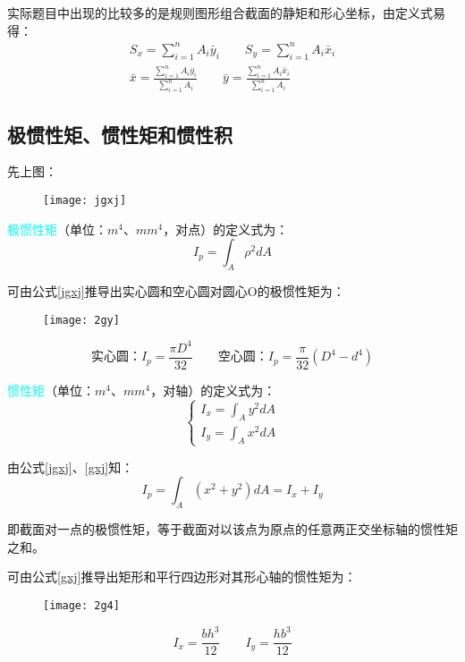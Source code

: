 \documentclass[10pt,a4paper]{ctexart}
\begin{document}
实际题目中出现的比较多的是规则图形组合截面的静矩和形心坐标，由定义式易得：
\begin{gather}
	S_x=\sum_{i=1}^n A_i\bar{y}_i \qquad S_y=\sum_{i=1}^n A_i\bar{x}_i\\
	\bar{x}=\frac{\sum\limits_{i=1}^n A_i\bar{y}_i}{\sum\limits_{i=1}^n A_i} \qquad \bar{y}=\frac{\sum\limits_{i=1}^n A_i\bar{x}_i}{\sum\limits_{i=1}^n A_i}
\end{gather}	
		
\subsection{极惯性矩、惯性矩和惯性积}
先上图：
\begin{figure}[htp]%
	\centering
	\texttt{[image: jgxj]}
\end{figure}

\textcolor{cyan}{极惯性矩}（单位：$m^4$、$mm^4$，对点）的定义式为：
\begin{equation}
	I_p=\int_A\rho^2dA
	\label{jgxj}
\end{equation}

可由公式\ref{jgxj}推导出实心圆和空心圆对圆心O的极惯性矩为：
\begin{figure}[htp]%
	\centering
	\texttt{[image: 2gy]}
\end{figure}

\begin{equation}%
\mbox{实心圆：} I_p=\frac{\pi D^4}{32} \qquad \mbox{空心圆：} I_p=\frac{\pi}{32}(D^4-d^4)
\end{equation}

\textcolor{cyan}{惯性矩}（单位：$m^4$、$mm^4$，对轴）的定义式为：
\begin{equation}
\begin{cases}
I_x=\int_A y^2dA\\
I_y=\int_A x^2dA
\end{cases}
\label{gxj}
\end{equation}

由公式\ref{jgxj}、\ref{gxj}知：
\begin{equation}
	I_p=\int_A(x^2+y^2)dA=I_x+I_y
\end{equation}

即截面对一点的极惯性矩，等于截面对以该点为原点的任意两正交坐标轴的惯性矩之和。

可由公式\ref{gxj}推导出矩形和平行四边形对其形心轴的惯性矩为：
\begin{figure}[htp]%
	\centering
	\texttt{[image: 2g4]}
\end{figure}
\begin{equation}
	I_x=\frac{bh^3}{12} \qquad I_y=\frac{hb^3}{12}
\end{equation}
\end{document}
